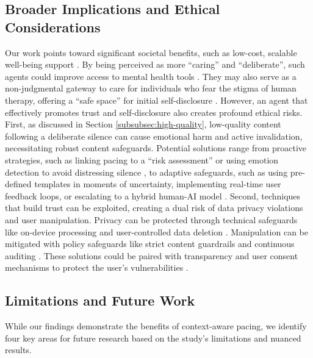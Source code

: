 \subsection{Broader Implications and Ethical Considerations}
Our work points toward significant societal benefits, such as low-cost, scalable well-being support \cite{jiang2023data, jiang2023healthprism}. By being perceived as more ``caring'' and ``deliberate'', such agents could improve access to mental health tools \cite{Thieme2022Designing}. They may also serve as a non-judgmental gateway to care for individuals who fear the stigma of human therapy, offering a ``safe space'' for initial self-disclosure \cite{Chung2023Im}. However, an agent that effectively promotes trust and self-disclosure also creates profound ethical risks.
First, as discussed in Section \ref{subsubsec:high-quality}, low-quality content following a deliberate silence can cause emotional harm and active invalidation, necessitating robust content safeguards. Potential solutions range from proactive strategies, such as linking pacing to a ``risk assessment'' or using emotion detection to avoid distressing silence \cite{Gosmar2024Insight}, to adaptive safeguards, such as using pre-defined templates in moments of uncertainty, implementing real-time user feedback loops, or escalating to a hybrid human-AI model \cite{Wang2024The, Taher2024The}.
Second, techniques that build trust can be exploited, creating a dual risk of data privacy violations and user manipulation. Privacy can be protected through technical safeguards like on-device processing and user-controlled data deletion \cite{Zhang2021Breaking}. Manipulation can be mitigated with policy safeguards like strict content guardrails and continuous auditing \cite{Lchner2025Digital}. These solutions could be paired with transparency and user consent mechanisms to protect the user's vulnerabilities \cite{Zhang2021Breaking}.

\subsection{Limitations and Future Work}
\label{subsec:limitation}
While our findings demonstrate the benefits of context-aware pacing, we identify four key areas for future research based on the study's limitations and nuanced results.
